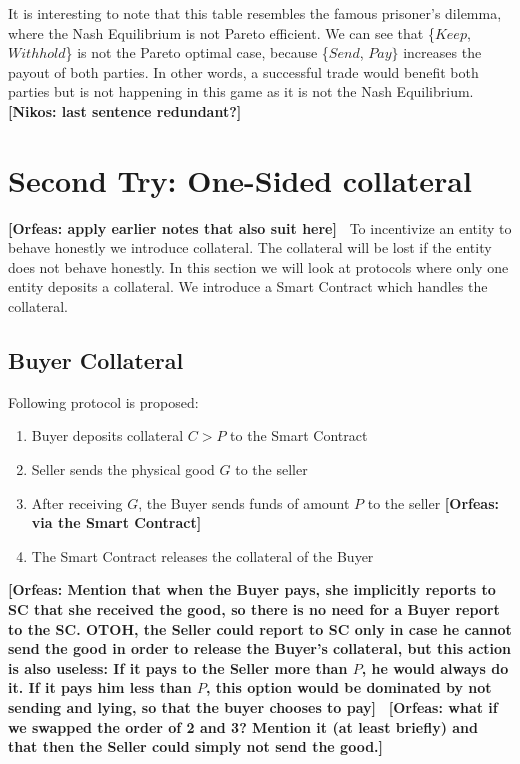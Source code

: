 \documentclass{cacthesis}
\newcommand{\authnote}[3]{{ \footnotesize \textbf{#1[#2: #3]~}}}
\newcommand{\orfnote}[1]{\authnote{\color{blue}}{Orfeas}{#1}}
\newcommand{\niknote}[1]{\authnote{\color{red}}{Nikos}{#1}}
\begin{document}
It is interesting to note that this table resembles the famous prisoner's dilemma, where the Nash Equilibrium is not Pareto efficient. We can see that \{$Keep$, $Withhold$\} is not the Pareto optimal case, because \{$Send$, $Pay\}$ increases the payout of both parties. 
In other words, a successful trade would benefit both parties but is not happening in this game as it is not the Nash Equilibrium. \niknote{last sentence redundant?}


\section{Second Try: One-Sided collateral}  \orfnote{apply earlier notes that also suit here}
To incentivize an entity to behave honestly we introduce collateral. The collateral will be lost if the entity does not behave honestly. In this section we will look at protocols where only one entity deposits a collateral. We introduce a Smart Contract which handles the collateral.

\subsection{Buyer Collateral}
Following protocol is proposed:
\begin{enumerate}
    \item Buyer deposits collateral $C > P$ to the Smart Contract
    \item Seller sends the physical good $G$ to the seller
    \item After receiving $G$, the Buyer sends funds of amount $P$ to the seller
    \orfnote{via the Smart Contract}
    \item The Smart Contract releases the collateral of the Buyer
\end{enumerate} \orfnote{Mention that when the Buyer pays, she implicitly
reports to SC that she received the good, so there is no need for a Buyer report
to the SC. OTOH, the Seller could report to SC only in case he cannot send the
good in order to release the Buyer's collateral, but this action is also
useless: If it pays to the Seller more than $P$, he would always do it. If it
pays him less than $P$, this option would be dominated by not sending and lying,
so that the buyer chooses to pay} \orfnote{what if we swapped the order of 2 and
3? Mention it (at least briefly) and that then the Seller could simply not send
the good.}
\end{document}

